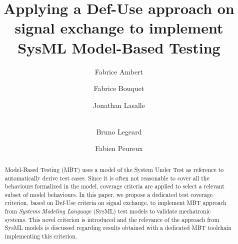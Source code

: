 \documentclass{llncs}
\begin{document}
\title{Applying a Def-Use approach on signal
exchange to implement SysML Model-Based Testing}

\author{Fabrice Ambert \and Fabrice Bouquet \and
  Jonathan Lasalle \and \\ Bruno Legeard \and
  Fabien Peureux }



\maketitle

\begin{abstract}
Model-Based Testing (MBT) uses a model of the System Under Test as
reference to automatically derive test cases. Since it is often not
reasonable to cover all the behaviours formalized in the model,
coverage criteria are applied to select a relevant subset of model
behaviours. In this paper, we propose a dedicated test coverage
criterion, based on Def-Use criteria on signal exchange, to implement
MBT approach from \textit{Systems Modeling Language} (SysML) test
models to validate mechatronic systems. This novel criterion is
introduced and the relevance of the approach from SysML models is
discussed regarding results obtained with a dedicated MBT toolchain 
implementing this criterion. 
\end{abstract}
\end{document}
